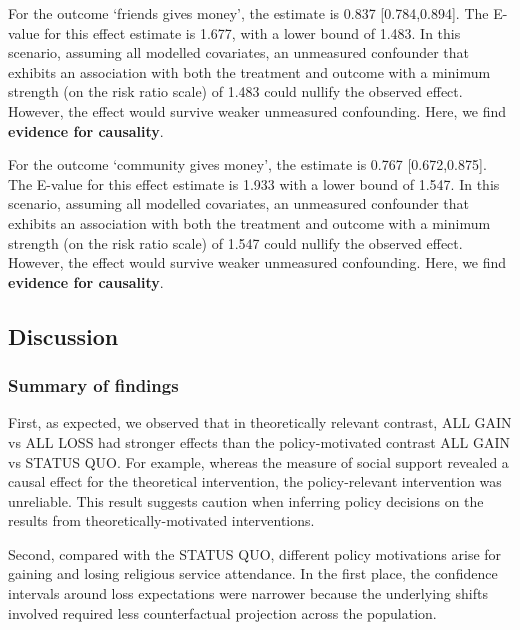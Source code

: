 \documentclass[
  singlecolumn]{article}
\begin{document}
For the outcome `friends gives money', the estimate is 0.837
{[}0.784,0.894{]}. The E-value for this effect estimate is 1.677, with a
lower bound of 1.483. In this scenario, assuming all modelled
covariates, an unmeasured confounder that exhibits an association with
both the treatment and outcome with a minimum strength (on the risk
ratio scale) of 1.483 could nullify the observed effect. However, the
effect would survive weaker unmeasured confounding. Here, we find
\textbf{evidence for causality}.

For the outcome `community gives money', the estimate is 0.767
{[}0.672,0.875{]}. The E-value for this effect estimate is 1.933 with a
lower bound of 1.547. In this scenario, assuming all modelled
covariates, an unmeasured confounder that exhibits an association with
both the treatment and outcome with a minimum strength (on the risk
ratio scale) of 1.547 could nullify the observed effect. However, the
effect would survive weaker unmeasured confounding. Here, we find
\textbf{evidence for causality}.

\subsection{Discussion}\label{discussion}

\subsubsection{Summary of findings}\label{summary-of-findings}

First, as expected, we observed that in theoretically relevant contrast,
ALL GAIN vs ALL LOSS had stronger effects than the policy-motivated
contrast ALL GAIN vs STATUS QUO. For example, whereas the measure of
social support revealed a causal effect for the theoretical
intervention, the policy-relevant intervention was unreliable. This
result suggests caution when inferring policy decisions on the results
from theoretically-motivated interventions.

Second, compared with the STATUS QUO, different policy motivations arise
for gaining and losing religious service attendance. In the first place,
the confidence intervals around loss expectations were narrower because
the underlying shifts involved required less counterfactual projection
across the population.
\end{document}
